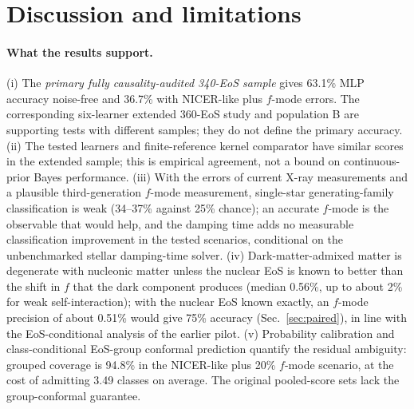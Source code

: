 \documentclass[11pt,a4paper]{article}
\begin{document}
\section{Discussion and limitations}
\paragraph{What the results support.} (i) The \emph{primary fully causality-audited 340-EoS sample} gives 63.1\% MLP accuracy noise-free and 36.7\% with NICER-like plus $f$-mode errors. The corresponding six-learner extended 360-EoS study and population B are supporting tests with different samples; they do not define the primary accuracy. (ii) The tested learners and finite-reference kernel comparator have similar scores in the extended sample; this is empirical agreement, not a bound on continuous-prior Bayes performance. (iii) With the errors of current X-ray measurements and a plausible third-generation $f$-mode measurement, single-star generating-family classification is weak (34--37\% against 25\% chance); an accurate $f$-mode is the observable that would help, and the damping time adds no measurable classification improvement in the tested scenarios, conditional on the unbenchmarked stellar damping-time solver. (iv) Dark-matter-admixed matter is degenerate with nucleonic matter unless the nuclear EoS is known to better than the shift in $f$ that the dark component produces (median 0.56\%, up to about 2\% for weak self-interaction); with the nuclear EoS known exactly, an $f$-mode precision of about 0.51\% would give 75\% accuracy (Sec.~\ref{sec:paired}), in line with the EoS-conditional analysis of the earlier pilot. (v) Probability calibration and class-conditional EoS-group conformal prediction quantify the residual ambiguity: grouped coverage is 94.8\% in the NICER-like plus 20\% $f$-mode scenario, at the cost of admitting 3.49 classes on average. The original pooled-score sets lack the group-conformal guarantee.
\end{document}
